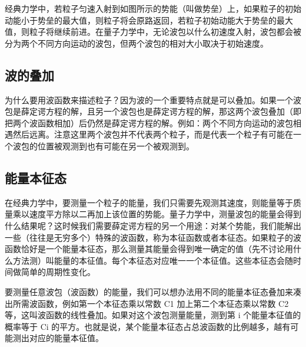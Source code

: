 经典力学中，若粒子匀速入射到如图所示的势能（叫做势垒）上，如果粒子的初始动能小于势垒的最大值，则粒子将会原路返回，若粒子初始动能大于势垒的最大值，则粒子将继续前进。在量子力学中，无论波包以什么初速度入射，波包都会被分为两个不同方向运动的波包，但两个波包的相对大小取决于初始速度。

\subsection{波的叠加}
为什么要用波函数来描述粒子？因为波的一个重要特点就是可以叠加。如果一个波包是薛定谔方程的解，且另一个波包也是薛定谔方程的解，那这两个波包叠加（即把两个波函数相加）后仍然是薛定谔方程的解。例如：两个不同方向运动的波包相遇然后远离。注意这里两个波包并不代表两个粒子，而是代表一个粒子有可能在一个波包的位置被观测到也有可能在另一个被观测到。

\subsection{能量本征态}
在经典力学中，要测量一个粒子的能量，我们只需要先观测其速度，则能量等于质量乘以速度平方除以二再加上该位置的势能。量子力学中，测量波包的能量会得到什么结果呢？这时候我们需要薛定谔方程的另一个用途：对某个势能，我们能解出一些（往往是无穷多个）特殊的波函数，称为本征函数或者本征态。如果粒子的波函数恰好是一个能量本征态，那么测量其能量会得到唯一确定的值（先不讨论用什么方法测）叫能量的本征值。每个本征态对应唯一一个本征值。这些本征态会随时间做简单的周期性变化。

要测量任意波包（波函数）的能量，我们可以想办法用不同的能量本征态叠加来凑出所需波函数，例如第一个本征态乘以常数 C1 加上第二个本征态乘以常数 C2 等，这叫波函数的线性叠加。如果对这个波包测量能量，测到第 i 个能量本征值的概率等于 Ci 的平方。也就是说，某个能量本征态占总波函数的比例越多，越有可能测出对应的能量本征值。


